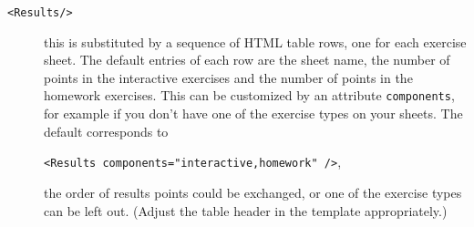 \documentclass[12pt,openany,a4paper]{book}
\begin{document}
\begin{description}
\item[\texttt{<Results/>}] this is substituted by a 
sequence of HTML table rows, one
for each exercise sheet. The default entries of each row are the sheet name,
the number of points in the interactive exercises and the number of points
in the homework exercises. This can be customized by an attribute
\texttt{components}, for example if you don't have one of the exercise types
on your sheets. The default corresponds to 

\hspace{5mm}\texttt{<Results components="interactive,homework" />},

the order of results points could be exchanged, or one of the exercise types
can be left out. (Adjust the table header in the template appropriately.)


\end{description}
\end{document}
